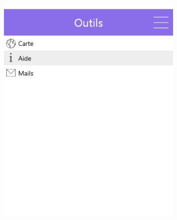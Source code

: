\documentclass{eplmastersthesis}
\begin{document}
\begin{figure}[H]
    \centering
\begin{subfigure}[b]{0.3\textwidth}
        \includegraphics[width=\textwidth]{Images/InVision/tools.png}
    \end{subfigure}
    ~ %
    \begin{subfigure}[b]{0.3\textwidth}

\end{subfigure}
\end{figure}
\end{document}
